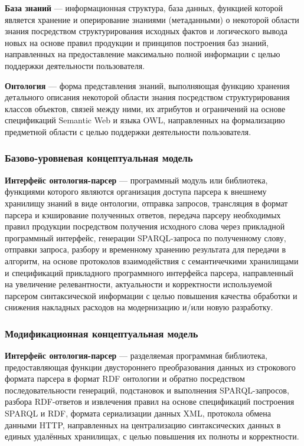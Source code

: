 \textbf{База знаний} --- информационная структура, база данных, функцией которой является хранение и оперирование знаниями (метаданными) о некоторой области знания посредством структурирования исходных фактов и логического вывода новых на основе правил продукции и принципов построения баз знаний, направленных на предоставление максимально полной информации с целью поддержки деятельности пользователя.

\textbf{Онтология} --- форма представления знаний, выполняющая функцию хранения детального описания некоторой области знания посредством структурирования классов объектов, связей между ними, их атрибутов и ограничений на основе спецификаций Semantic Web и языка OWL, направленных на формализацию предметной области с целью поддержки деятельности пользователя.

\subsubsection{Базово-уровневая концептуальная модель}

\textbf{Интерфейс онтология-парсер} --- программный модуль или библиотека, функциями которого являются организация доступа парсера к внешнему хранилищу знаний в виде онтологии, отправка запросов, трансляция в формат парсера и кэширование полученных ответов, передача парсеру необходимых правил продукции посредством получения исходного слова через прикладной программный интерфейс, генерации SPARQL-запроса по полученному слову, отправки запроса, разбору и временному хранению результата для передачи в алгоритм, на основе протоколов взаимодействия с семантичечкими хранилищами и спецификаций прикладного программного интерфейса парсера, направленный на увеличение релевантности, актуальности и корректности используемой парсером синтаксической информации с целью повышения качества обработки и снижения накладных расходов на модернизацию и/или новую разработку.

\subsubsection{Модификационная концептуальная модель}

\textbf{Интерфейс онтология-парсер} --- разделяемая программная библиотека, предоставляющая функции двустороннего преобразования данных из строкового формата парсера в формат RDF онтологии и обратно посредством последовательности генераций, подстановок и выполнения SPARQL-запросов, разбора RDF-ответов и извлечения правил на основе спецификаций построения SPARQL и RDF, формата сериализации данных XML, протокола обмена данными HTTP, направленных на централизацию синтаксических данных в единых удалённых хранилищах, с целью повышения их полноты и корректности.

